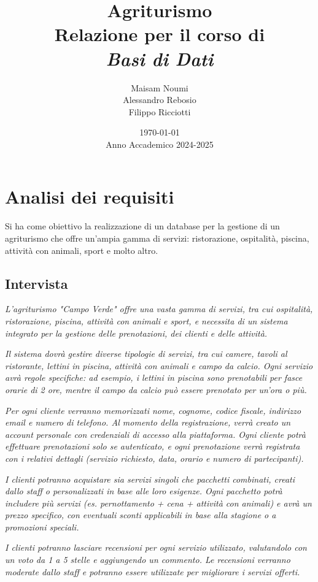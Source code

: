 \documentclass[a4paper,12pt]{report}
\title{
    \vspace*{2cm}
    \Huge\textbf{Agriturismo} \\[0.5cm]
    \LARGE Relazione per il corso di \\[0.2cm]
    \textit{Basi di Dati} \\[2cm]
}
\author{
    \Large
    Maisam Noumi \\
    Alessandro Rebosio \\
    Filippo Ricciotti
}
\date{
    \vspace{1cm}
    \today \\[0.5cm]
    Anno Accademico 2024-2025
}
\begin{document}
\maketitle

\tableofcontents

\chapter{Analisi dei requisiti}
Si ha come obiettivo la realizzazione di un database per la gestione di un agriturismo che offre
un'ampia gamma di servizi: ristorazione, ospitalità, piscina, attività con animali, sport e molto altro.

\section{Intervista}
\textit{L'agriturismo "Campo Verde" offre una vasta gamma di servizi, tra cui ospitalità, ristorazione,
	piscina, attività con animali e sport, e necessita di un sistema integrato per la gestione delle
	prenotazioni, dei clienti e delle attività.}

\textit{Il sistema dovrà gestire diverse tipologie di servizi, tra cui camere, tavoli al ristorante,
	lettini in piscina, attività con animali e campo da calcio. Ogni servizio avrà regole specifiche:
	ad esempio, i lettini in piscina sono prenotabili per fasce orarie di 2 ore, mentre il campo da calcio
	può essere prenotato per un'ora o più.}

\textit{Per ogni cliente verranno memorizzati nome, cognome, codice fiscale, indirizzo email e numero
	di telefono. Al momento della registrazione, verrà creato un account personale con credenziali di
	accesso alla piattaforma. Ogni cliente potrà effettuare prenotazioni solo se autenticato, e ogni
	prenotazione verrà registrata con i relativi dettagli (servizio richiesto, data, orario e numero di
	partecipanti).}

\textit{I clienti potranno acquistare sia servizi singoli che pacchetti combinati, creati dallo staff
	o personalizzati in base alle loro esigenze. Ogni pacchetto potrà includere più servizi (es.
	pernottamento + cena + attività con animali) e avrà un prezzo specifico, con eventuali sconti
	applicabili in base alla stagione o a promozioni speciali.}

\textit{I clienti potranno lasciare recensioni per ogni servizio utilizzato, valutandolo con un voto
	da 1 a 5 stelle e aggiungendo un commento. Le recensioni verranno moderate dallo staff e potranno
	essere utilizzate per migliorare i servizi offerti.}
\end{document}
